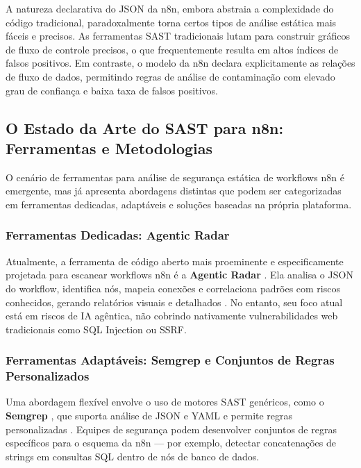 \documentclass{sftex}
\begin{document}
A natureza declarativa do JSON da n8n, embora abstraia a complexidade do código tradicional, paradoxalmente torna certos tipos de análise estática mais fáceis e precisos. As ferramentas SAST tradicionais lutam para construir gráficos de fluxo de controle precisos, o que frequentemente resulta em altos índices de falsos positivos. Em contraste, o modelo da n8n declara explicitamente as relações de fluxo de dados, permitindo regras de análise de contaminação com elevado grau de confiança e baixa taxa de falsos positivos.

\subsection{O Estado da Arte do SAST para n8n: Ferramentas e Metodologias}

O cenário de ferramentas para análise de segurança estática de workflows n8n é emergente, mas já apresenta abordagens distintas que podem ser categorizadas em ferramentas dedicadas, adaptáveis e soluções baseadas na própria plataforma.

\subsubsection{Ferramentas Dedicadas: Agentic Radar}

Atualmente, a ferramenta de código aberto mais proeminente e especificamente projetada para escanear workflows n8n é a \textbf{Agentic Radar} \cite{splxai_n8n_scanning}. Ela analisa o JSON do workflow, identifica nós, mapeia conexões e correlaciona padrões com riscos conhecidos, gerando relatórios visuais e detalhados \cite{splxai_medium_scanning}. No entanto, seu foco atual está em riscos de IA agêntica, não cobrindo nativamente vulnerabilidades web tradicionais como SQL Injection ou SSRF.

\subsubsection{Ferramentas Adaptáveis: Semgrep e Conjuntos de Regras Personalizados}

Uma abordagem flexível envolve o uso de motores SAST genéricos, como o \textbf{Semgrep} \cite{semgrep_platform}, que suporta análise de JSON e YAML e permite regras personalizadas \cite{semgrep_custom_rules}. Equipes de segurança podem desenvolver conjuntos de regras específicos para o esquema da n8n — por exemplo, detectar concatenações de strings em consultas SQL dentro de nós de banco de dados.
\end{document}
